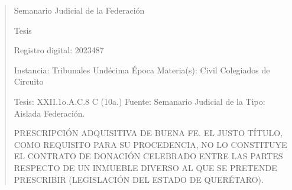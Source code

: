 \documentclass[11pt,a4paper]{article}
\begin{document}
\begin{quote}
                                                   Semanario Judicial de la Federación

                                                Tesis

 Registro digital: 2023487

 Instancia: Tribunales             Undécima Época                         Materia(s): Civil
 Colegiados de Circuito

 Tesis: XXII.1o.A.C.8 C (10a.)     Fuente: Semanario Judicial de la       Tipo: Aislada
                                   Federación.


PRESCRIPCIÓN ADQUISITIVA DE BUENA FE. EL JUSTO TÍTULO, COMO REQUISITO PARA SU
PROCEDENCIA, NO LO CONSTITUYE EL CONTRATO DE DONACIÓN CELEBRADO ENTRE
LAS PARTES RESPECTO DE UN INMUEBLE DIVERSO AL QUE SE PRETENDE PRESCRIBIR
(LEGISLACIÓN DEL ESTADO DE QUERÉTARO).



\end{quote}
\end{document}
